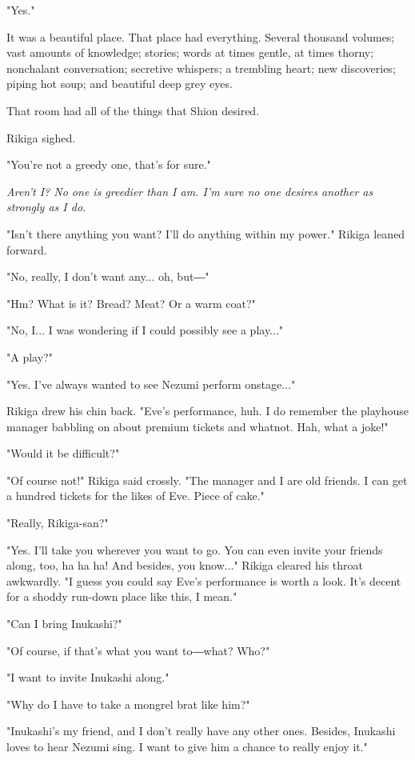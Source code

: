 "Yes."

It was a beautiful place. That place had everything. Several thousand volumes; vast amounts of knowledge; stories; words at times gentle, at times thorny; nonchalant conversation; secretive whispers; a trembling heart; new discoveries; piping hot soup; and beautiful deep grey eyes.

That room had all of the things that Shion desired.

Rikiga sighed.

"You're not a greedy one, that's for sure."

\emph{Aren't I? No one is greedier than I am. I'm sure no one desires another as strongly as I do.}

"Isn't there anything you want? I'll do anything within my power." Rikiga leaned forward.

"No, really, I don't want any... oh, but―"

"Hm? What is it? Bread? Meat? Or a warm coat?"

"No, I... I was wondering if I could possibly see a play..."

"A play?"

"Yes. I've always wanted to see Nezumi perform onstage..."

Rikiga drew his chin back. "Eve's performance, huh. I do remember the playhouse manager babbling on about premium tickets and whatnot. Hah, what a joke!"

"Would it be difficult?"

"Of course not!" Rikiga said crossly. "The manager and I are old friends. I can get a hundred tickets for the likes of Eve. Piece of cake."

"Really, Rikiga-san?"

"Yes. I'll take you wherever you want to go. You can even invite your friends along, too, ha ha ha! And besides, you know..." Rikiga cleared his throat awkwardly. "I guess you could say Eve's performance is worth a look. It's decent for a shoddy run-down place like this, I mean."

"Can I bring Inukashi?"

"Of course, if that's what you want to―what? Who?"

"I want to invite Inukashi along."

"Why do I have to take a mongrel brat like him?"

"Inukashi's my friend, and I don't really have any other ones. Besides, Inukashi loves to hear Nezumi sing. I want to give him a chance to really enjoy it."

